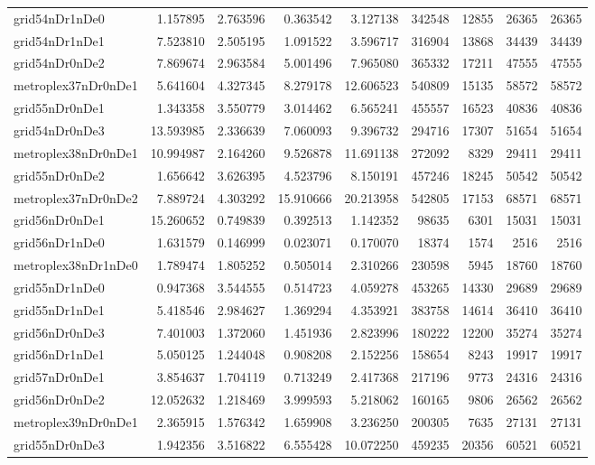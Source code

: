 \documentclass[../../../thesis.tex]{subfiles}
\begin{document}
\begin{longtable}{|l|r|r|r|r|r|r|r|r|}
grid54nDr1nDe0 & 1.157895 & 2.763596 & 0.363542 & 3.127138 & 342548 & 12855 & 26365 & 26365 \\
grid54nDr1nDe1 & 7.523810 & 2.505195 & 1.091522 & 3.596717 & 316904 & 13868 & 34439 & 34439 \\
grid54nDr0nDe2 & 7.869674 & 2.963584 & 5.001496 & 7.965080 & 365332 & 17211 & 47555 & 47555 \\
metroplex37nDr0nDe1 & 5.641604 & 4.327345 & 8.279178 & 12.606523 & 540809 & 15135 & 58572 & 58572 \\
grid55nDr0nDe1 & 1.343358 & 3.550779 & 3.014462 & 6.565241 & 455557 & 16523 & 40836 & 40836 \\
grid54nDr0nDe3 & 13.593985 & 2.336639 & 7.060093 & 9.396732 & 294716 & 17307 & 51654 & 51654 \\
metroplex38nDr0nDe1 & 10.994987 & 2.164260 & 9.526878 & 11.691138 & 272092 & 8329 & 29411 & 29411 \\
grid55nDr0nDe2 & 1.656642 & 3.626395 & 4.523796 & 8.150191 & 457246 & 18245 & 50542 & 50542 \\
metroplex37nDr0nDe2 & 7.889724 & 4.303292 & 15.910666 & 20.213958 & 542805 & 17153 & 68571 & 68571 \\
grid56nDr0nDe1 & 15.260652 & 0.749839 & 0.392513 & 1.142352 & 98635 & 6301 & 15031 & 15031 \\
grid56nDr1nDe0 & 1.631579 & 0.146999 & 0.023071 & 0.170070 & 18374 & 1574 & 2516 & 2516 \\
metroplex38nDr1nDe0 & 1.789474 & 1.805252 & 0.505014 & 2.310266 & 230598 & 5945 & 18760 & 18760 \\
grid55nDr1nDe0 & 0.947368 & 3.544555 & 0.514723 & 4.059278 & 453265 & 14330 & 29689 & 29689 \\
grid55nDr1nDe1 & 5.418546 & 2.984627 & 1.369294 & 4.353921 & 383758 & 14614 & 36410 & 36410 \\
grid56nDr0nDe3 & 7.401003 & 1.372060 & 1.451936 & 2.823996 & 180222 & 12200 & 35274 & 35274 \\
grid56nDr1nDe1 & 5.050125 & 1.244048 & 0.908208 & 2.152256 & 158654 & 8243 & 19917 & 19917 \\
grid57nDr0nDe1 & 3.854637 & 1.704119 & 0.713249 & 2.417368 & 217196 & 9773 & 24316 & 24316 \\
grid56nDr0nDe2 & 12.052632 & 1.218469 & 3.999593 & 5.218062 & 160165 & 9806 & 26562 & 26562 \\
metroplex39nDr0nDe1 & 2.365915 & 1.576342 & 1.659908 & 3.236250 & 200305 & 7635 & 27131 & 27131 \\
grid55nDr0nDe3 & 1.942356 & 3.516822 & 6.555428 & 10.072250 & 459235 & 20356 & 60521 & 60521 \\

\end{longtable}
\end{document}
